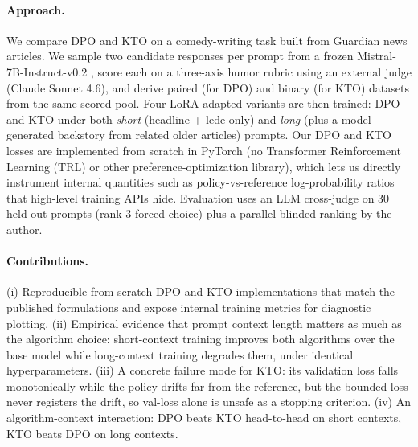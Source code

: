 \paragraph{Approach.}
We compare DPO and KTO on a comedy-writing task built from Guardian news articles.  We sample two candidate responses per prompt from a frozen Mistral-7B-Instruct-v0.2 \cite{jiang2023mistral}, score each on a three-axis humor rubric using an external judge (Claude Sonnet 4.6), and derive paired (for DPO) and binary (for KTO) datasets from the same scored pool.  Four LoRA-adapted variants \cite{hu2021lora,dettmers2023qlora} are then trained: DPO and KTO under both \emph{short} (headline + lede only) and \emph{long} (plus a model-generated backstory from related older articles) prompts.  Our DPO and KTO losses are implemented from scratch in PyTorch (no Transformer Reinforcement Learning (TRL) or other preference-optimization library), which lets us directly instrument internal quantities such as policy-vs-reference log-probability ratios that high-level training APIs hide.  Evaluation uses an LLM cross-judge on 30 held-out prompts (rank-3 forced choice) plus a parallel blinded ranking by the author.

\paragraph{Contributions.}
(i) Reproducible from-scratch DPO and KTO implementations that match the published formulations and expose internal training metrics for diagnostic plotting.  (ii) Empirical evidence that prompt context length matters as much as the algorithm choice: short-context training improves both algorithms over the base model while long-context training degrades them, under identical hyperparameters.  (iii) A concrete failure mode for KTO: its validation loss falls monotonically while the policy drifts far from the reference, but the bounded loss never registers the drift, so val-loss alone is unsafe as a stopping criterion.  (iv) An algorithm-context interaction: DPO beats KTO head-to-head on short contexts, KTO beats DPO on long contexts.
